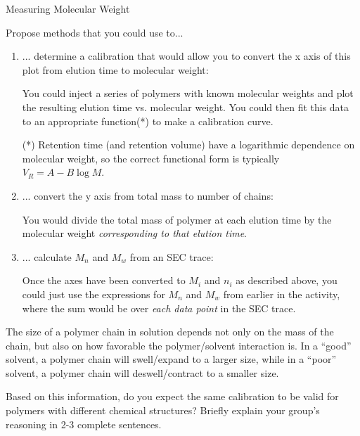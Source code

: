 \begin{activity}{Measuring Molecular Weight}
\begin{ctqs}
	\question Propose methods that you could use to...
	
		\begin{enumerate}
			\item ... determine a calibration that would allow you to convert the x axis of this plot from elution time to molecular weight:
	
				\begin{solution}[1in]
					You could inject a series of polymers with known molecular weights and plot the resulting elution time vs. molecular weight.  You could then fit this data to an appropriate function(*) to make a calibration curve.
					
					(*) Retention time (and retention volume) have a logarithmic dependence on molecular weight, so the correct functional form is typically $V_R = A - B \log M$.
					
				\end{solution}
			
			\item ... convert the y axis from total mass to number of chains:
	
				\begin{solution}[1in]
					You would divide the total mass of polymer at each elution time by the molecular weight \emph{corresponding to that elution time}.
				\end{solution}
			
			\item ... calculate $M_n$ and $M_w$ from an SEC trace:
	
				\begin{solution}[1.5in]
					Once the axes have been converted to $M_i$ and $n_i$ as described above, you could just use the expressions for $M_n$ and $M_w$ from earlier in the activity, where the sum would be over \emph{each data point} in the SEC trace.
				\end{solution}
		
		\end{enumerate}
	
	\clearpage
	\question The size of a polymer chain in solution depends not only on the mass of the chain, but also on how favorable the polymer/solvent interaction is.  In a ``good'' solvent, a polymer chain will swell/expand to a larger size, while in a ``poor'' solvent, a polymer chain will deswell/contract to a smaller size.
	
		Based on this information, do you expect the same calibration to be valid for polymers with different chemical structures?  Briefly explain your group's reasoning in 2-3 complete sentences.		
	

\end{ctqs}
\end{activity}
